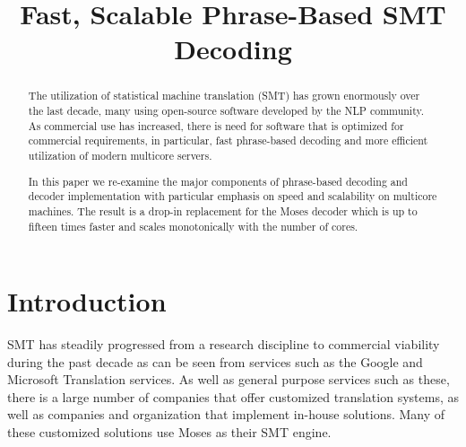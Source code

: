 \documentclass[]{article}
\begin{document}
\title{\bf Fast, Scalable Phrase-Based SMT Decoding}  


\maketitle
\pagestyle{empty}

\begin{abstract}
The utilization of statistical machine translation (SMT) has grown enormously over the last decade, many using open-source software developed by the NLP community. As commercial use has increased, there is need for  software that is optimized for commercial requirements, in particular, fast phrase-based decoding and more efficient utilization of modern multicore servers.

In this paper we re-examine the major components of phrase-based decoding and decoder implementation with particular emphasis on speed and scalability on multicore machines. The result is a drop-in replacement for the Moses decoder which is up to fifteen times faster and scales monotonically with the number of cores. 
\end{abstract}

\section{Introduction}

SMT has steadily progressed from a research discipline to commercial viability during the past decade as can be seen from services such as the Google and Microsoft Translation services. As well as general purpose services such as these, there is a large number of companies that offer customized translation systems, as well as  companies and organization that implement in-house solutions. Many of these customized solutions use Moses as their SMT engine.
\end{document}
